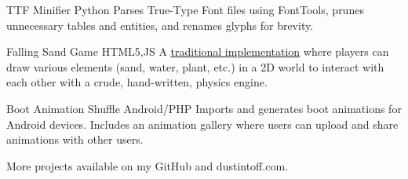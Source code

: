  {TTF Minifier} {Python} {
    Parses True-Type Font files using  {FontTools}, prunes unnecessary tables and entities, and renames glyphs for brevity.
}

 {Falling Sand Game} {HTML5,JS} {
    A \href {https://en.wikipedia.org/wiki/Falling-sand_game} {traditional implementation} where players can draw various elements (sand, water, plant, etc.) in a 2D world to interact with each other with a crude, hand-written, physics engine.
}

 {Boot Animation Shuffle} {Android/PHP} {
    Imports and generates boot animations for Android devices. Includes an animation gallery where users can upload and share animations with other users.
}

More projects available on { {my GitHub}} and { {dustintoff.com}}.